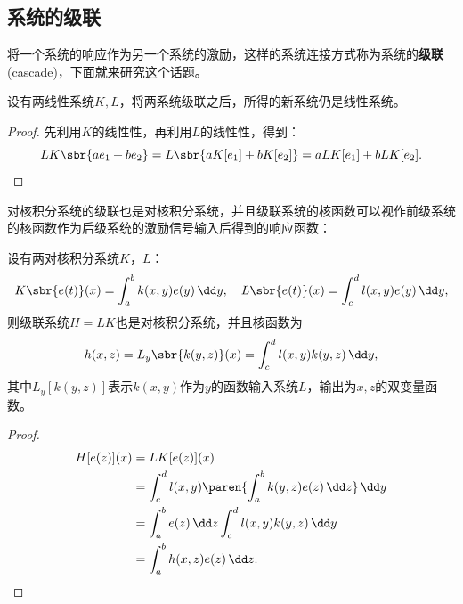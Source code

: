 \subsection{系统的级联}\label{sub:cascade}
将一个系统的响应作为另一个系统的激励，这样的系统连接方式称为系统的\textbf{级联}(cascade)，下面就来研究这个话题。
\begin{theorem}[线性系统的级联]
    设有两线性系统$K,L$，将两系统级联之后，所得的新系统仍是线性系统。
\end{theorem}
\begin{proof}
    先利用$K$的线性性，再利用$L$的线性性，得到：
    \begin{equation}
        LK\sbr{ae_1+be_2}=L\sbr{aK[e_1]+bK[e_2]}=aLK[e_1]+bLK[e_2].
    \end{equation}
\end{proof}

对核积分系统的级联也是对核积分系统，并且级联系统的核函数可以视作前级系统的核函数作为后级系统的激励信号输入后得到的响应函数：
\begin{proposition}[对核积分系统的级联]
    设有两对核积分系统$K$，$L$：
    \begin{equation}
        K\sbr{e(t)}(x)=\int_{a}^{b}k(x,y)e(y)\,\dd y,\quad L\sbr{e(t)}(x)=\int_{c}^{d}l(x,y)e(y)\,\dd y,
    \end{equation}
    则级联系统$H=LK$也是对核积分系统，并且核函数为
    \begin{equation}
        h(x,z)=L_y\sbr{k(y,z)}(x)=\int_{c}^{d}l(x,y)k(y,z)\,\dd y,
    \end{equation}
    其中$L_y[k(y,z)]$表示$k(x,y)$作为$y$的函数输入系统$L$，输出为$x,z$的双变量函数。
\end{proposition}

\begin{proof}
    \begin{align}
        H[e(z)](x)&=LK[e(z)](x)\nonumber\\
        &=\int_{c}^{d}l(x,y)\paren{\int_{a}^{b}k(y,z)e(z)\,\dd z}\,\dd y\nonumber\\
        &=\int_{a}^{b}e(z)\,\dd z\int_{c}^{d}l(x,y)k(y,z)\,\dd y\nonumber\\
        &=\int_{a}^{b}h(x,z)e(z)\,\dd z.
    \end{align}
\end{proof}

